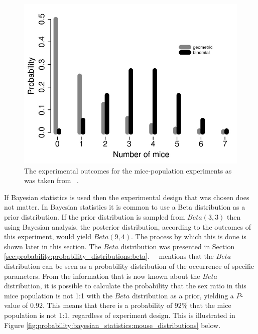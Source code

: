 \begin{figure}[htbp]
      \includegraphics[width=\textwidth]{images/mouse_experiment_outcome.jpg}
      \caption{The experimental outcomes for the mice-population experiments as was taken from~\cite{ref:hackenberger:2019} .}
      \label{fig:probability:bayesian_statistics:mouse_experiment_outcome}
\end{figure}

If Bayesian statistics is used then the experimental design that was chosen does not matter. In Bayesian statistics it is common to use a Beta distribution as a prior distribution. If the prior distribution is sampled from $Beta(3,3)$ then using Bayesian analysis, the posterior distribution, according to the outcomes of this experiment, would yield $Beta(9,4)$. The process by which this is done is shown later in this section. The $Beta$ distribution was presented in Section \ref{sec:probability:probability_distributions:beta}.~\citeauthor{ref:hackenberger:2019}~\cite{ref:hackenberger:2019} mentions that the $Beta$ distribution can be seen as a probability distribution of the occurrence of specific parameters. From the information that is now known about the $Beta$ distribution, it is possible to calculate the probability that the sex ratio in this mice population is not 1:1 with the $Beta$ distribution as a prior, yielding a $P$-value of $0.92$. This means that there is a probability of $92\%$ that the mice population is not 1:1, regardless of experiment design. This is illustrated in Figure \ref{fig:probability:bayesian_statistics:mouse_distributions} below.

